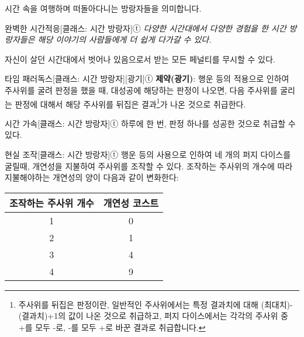 \documentclass{report}
\begin{document}
	시간 속을 여행하며 떠돌아다니는 방랑자들을 의미합니다.
	
	\begin{story}{완벽한 시간적응}{[클래스: 시간 방랑자]ⓣ}
		\textit{다양한 시간대에서 다양한 경험을 한 시간 방랑자들은 해당 이야기의 사람들에게 더 쉽게 다가갈 수 있다.}
		
		자신이 살던 시간대에서 벗어나 있음으로서 받는 모든 페널티를 무시할 수 있다.
		
	\end{story}
	
	\begin{story}{타임 패러독스}{[클래스: 시간 방랑자][광기]ⓣ}
		\textbf{제약(광기)}: 행운 등의 적용으로 인하여 주사위를 굴려 판정을 했을 때, 대성공에 해당하는 판정이 나오면, 다음 주사위를 굴리는 판정에 대해서 해당 주사위를 뒤집은 결과\footnote{주사위를 뒤집은 판정이란, 일반적인 주사위에서는 특정 결과치에 대해 (최대치)-(결과치)+1의 값이 나온 것으로 취급하고, 퍼지 다이스에서는 각각의 주사위 중 +를 모두 -로, -를 모두 +로 바꾼 결과로 취급합니다.}가 나온 것으로 취급한다.
		
	\end{story}
	
	\begin{story}{시간 가속}{[클래스: 시간 방랑자]ⓣ}
		하루에 한 번, 판정 하나를 성공한 것으로 취급할 수 있다.
		
	\end{story}
	
	\begin{story}{현실 조작}{[클래스: 시간 방랑자]ⓣ}
		행운 등의 사용으로 인하여 네 개의 퍼지 다이스를 굴릴때, 개연성을 지불하여 주사위를 조작할 수 있다. 조작하는 주사위의 개수에 따라 지불해야하는 개연성의 양이 다음과 같이 변화한다:
		\begin{center}
			\begin{tabular}{c|c}
				\textbf{조작하는 주사위 개수} & \textbf{개연성 코스트} \\\hline\hline
				1                             & 0                      \\\hline
				2                             & 1                      \\\hline
				3                             & 4                      \\\hline
				4                             & 9                      \\\hline
				
			\end{tabular}
		\end{center}
		
	\end{story}
\end{document}
